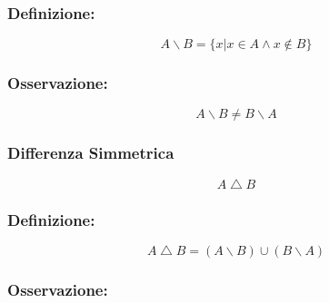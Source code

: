 \documentclass{article}
\begin{document}
        \subsubsection*{Definizione:}
        
        \begin{LARGE}
            \begin{equation*}
                A \backslash B = \{x | x \in A \wedge x \notin B\}
            \end{equation*}
        \end{LARGE}

        \subsubsection*{Osservazione:}

        \begin{Large}
            \begin{equation*}
                A \backslash B \ne B \backslash A
            \end{equation*}
        \end{Large}

        \subsubsection{Differenza Simmetrica}
        \begin{LARGE}
            \begin{equation*}
                A \bigtriangleup B
            \end{equation*}
        \end{LARGE}
        
        \subsubsection*{Definizione:}
        
        \begin{LARGE}
            \begin{equation*}
                A \bigtriangleup B = (A \backslash B) \cup (B \backslash A)
            \end{equation*}
        \end{LARGE}

        \subsubsection*{Osservazione:}
\end{document}
